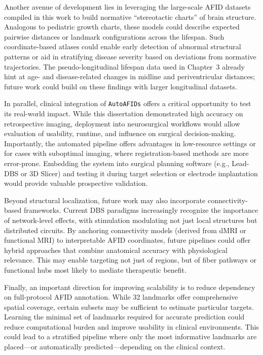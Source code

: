 Another avenue of development lies in leveraging the large-scale AFID datasets compiled in this work to build normative “stereotactic charts” of brain structure. Analogous to pediatric growth charts, these models could describe expected pairwise distances or landmark configurations across the lifespan. Such coordinate-based atlases could enable early detection of abnormal structural patterns or aid in stratifying disease severity based on deviations from normative trajectories. The pseudo-longitudinal lifespan data used in Chapter~3 already hint at age- and disease-related changes in midline and periventricular distances; future work could build on these findings with larger longitudinal datasets.

In parallel, clinical integration of \texttt{AutoAFIDs} offers a critical opportunity to test its real-world impact. While this dissertation demonstrated high accuracy on retrospective imaging, deployment into neurosurgical workflows would allow evaluation of usability, runtime, and influence on surgical decision-making. Importantly, the automated pipeline offers advantages in low-resource settings or for cases with suboptimal imaging, where registration-based methods are more error-prone. Embedding the system into surgical planning software (e.g., Lead-DBS or 3D Slicer) and testing it during target selection or electrode implantation would provide valuable prospective validation. 

Beyond structural localization, future work may also incorporate connectivity-based frameworks. Current DBS paradigms increasingly recognize the importance of network-level effects, with stimulation modulating not just local structures but distributed circuits. By anchoring connectivity models (derived from dMRI or functional MRI) to interpretable AFID coordinates, future pipelines could offer hybrid approaches that combine anatomical accuracy with physiological relevance. This may enable targeting not just of regions, but of fiber pathways or functional hubs most likely to mediate therapeutic benefit.

Finally, an important direction for improving scalability is to reduce dependency on full-protocol AFID annotation. While 32 landmarks offer comprehensive spatial coverage, certain subsets may be sufficient to estimate particular targets. Learning the minimal set of landmarks required for accurate prediction could reduce computational burden and improve usability in clinical environments. This could lead to a stratified pipeline where only the most informative landmarks are placed—or automatically predicted—depending on the clinical context.

